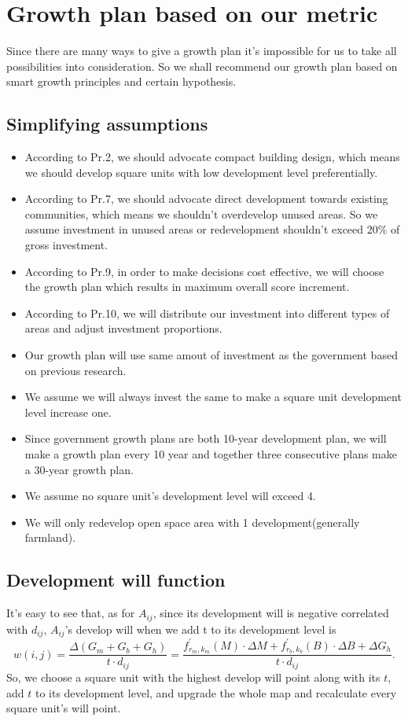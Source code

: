 
\section{Growth plan based on our metric}
Since there are many ways to give a growth plan it's impossible for us to take all possibilities into consideration.
So we shall recommend our growth plan based on smart growth principles and certain hypothesis.

\subsection{Simplifying assumptions}
\begin{itemize}
  \item According to Pr.2, we should advocate compact building design, which means we should develop square units with low development level preferentially.
  \item According to Pr.7, we should advocate direct development towards existing communities, which means we shouldn't overdevelop unused areas. So we assume investment in unused areas or redevelopment shouldn't exceed 20\% of gross investment.
  \item According to Pr.9, in order to make decisions cost effective, we will choose the growth plan which results in maximum overall score increment.
  \item According to Pr.10, we will distribute our investment into different types of areas and adjust investment proportions.
  \item Our growth plan will use same amout of investment as the government based on previous research.
  \item We assume we will always invest the same to make a square unit development level increase one.
  \item Since government growth plans are both 10-year development plan, we will make a growth plan every 10 year and together three consecutive plans make a 30-year growth plan.
  \item We assume no square unit's development level will exceed 4.
  \item We will only redevelop open space area with 1 development(generally farmland).
\end{itemize}

\subsection{Development will function}
It's easy to see that, as for $ A_{ij} $, since its development will is negative correlated with $ d_{ij} $, $ A_{ij} $'s develop will when we add t to its development level is $$ w(i,j)=\frac{\Delta (G_m+G_b+G_h)}{t\cdot d_{ij}}=\frac{f_{r_m, k_m}^{'} (M) \cdot \Delta M + f_{r_b, k_b}^{'} (B) \cdot \Delta B + \Delta G_h}{t \cdot d_{ij}}. $$ So, we choose a square unit with the highest develop will point along with its $t$, add $t$ to its development level, and upgrade the whole map and recalculate every square unit's will point.\\

